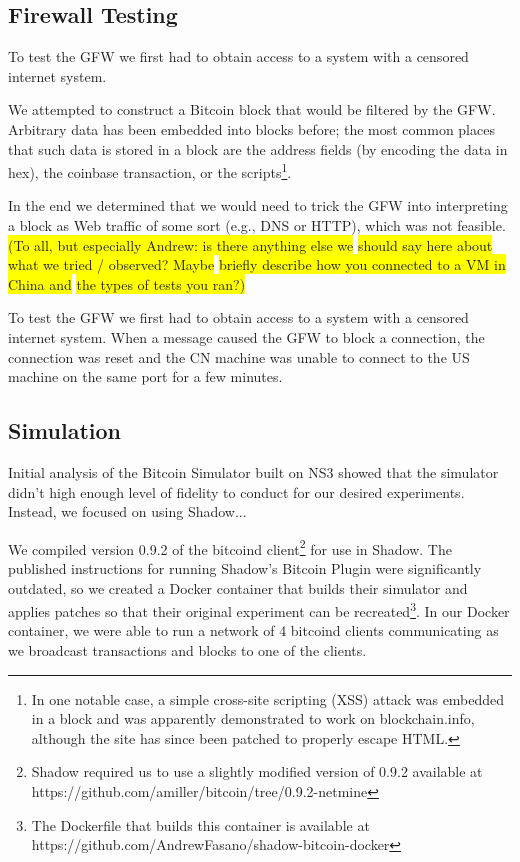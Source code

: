 \subsection{Firewall Testing}
To test the GFW we first had to obtain access to a system with a censored internet system. 

We attempted to construct a Bitcoin block that would be filtered by the GFW. Arbitrary data has been embedded into blocks before; the most common places that such data is stored in a block are the address fields (by encoding the data in hex), the coinbase transaction, or the scripts\footnote{In one notable case, a simple cross-site scripting (XSS) attack was embedded in a block and was apparently demonstrated to work on blockchain.info\cite{reddit}, although the site has since been patched to properly escape HTML.}. 

In the end we determined that we would need to trick the GFW into interpreting a block as Web traffic of some sort (e.g., DNS or HTTP), which was not feasible.
\colorbox{yellow}{(To all, but especially Andrew: is there anything else we}
\colorbox{yellow}{should say here about what we tried / observed? Maybe}
\colorbox{yellow}{briefly describe how you connected to a VM in China and}
\colorbox{yellow}{the types of tests you ran?)}

To test the GFW we first had to obtain access to a system with a censored internet system. 
When a message caused the GFW to block a connection, the connection was reset and the CN machine was unable to connect to the US machine on the same port for a few minutes.


\subsection{Simulation}
Initial analysis of the Bitcoin Simulator built on NS3 showed that the simulator didn't high enough level of fidelity to conduct for our desired experiments. Instead, we focused on using Shadow...

We compiled version 0.9.2 of the bitcoind client\footnote{Shadow required us to use a slightly modified version of 0.9.2 available at https://github.com/amiller/bitcoin/tree/0.9.2-netmine} for use in Shadow. The published instructions for running Shadow's Bitcoin Plugin were significantly outdated, so we created a Docker container that builds their simulator and applies patches so that their original experiment can be recreated\footnote{The Dockerfile that builds this container is available at https://github.com/AndrewFasano/shadow-bitcoin-docker}. In our Docker container, we were able to run a network of 4 bitcoind clients communicating as we broadcast transactions and blocks to one of the clients.

